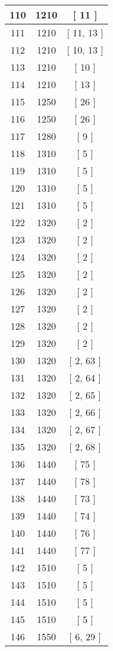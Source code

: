\begin{center}
\begin{longtable}[H]{|| c c c ||}
\hline
110 & 1210 & [ 11 ] \\ 
\hline
111 & 1210 & [ 11, 13 ] \\ 
\hline
112 & 1210 & [ 10, 13 ] \\ 
\hline
113 & 1210 & [ 10 ] \\ 
\hline
114 & 1210 & [ 13 ] \\ 
\hline
115 & 1250 & [ 26 ] \\ 
\hline
116 & 1250 & [ 26 ] \\ 
\hline
117 & 1280 & [ 9 ] \\ 
\hline
118 & 1310 & [ 5 ] \\ 
\hline
119 & 1310 & [ 5 ] \\ 
\hline
120 & 1310 & [ 5 ] \\ 
\hline
121 & 1310 & [ 5 ] \\ 
\hline
122 & 1320 & [ 2 ] \\ 
\hline
123 & 1320 & [ 2 ] \\ 
\hline
124 & 1320 & [ 2 ] \\ 
\hline
125 & 1320 & [ 2 ] \\ 
\hline
126 & 1320 & [ 2 ] \\ 
\hline
127 & 1320 & [ 2 ] \\ 
\hline
128 & 1320 & [ 2 ] \\ 
\hline
129 & 1320 & [ 2 ] \\ 
\hline
130 & 1320 & [ 2, 63 ] \\ 
\hline
131 & 1320 & [ 2, 64 ] \\ 
\hline
132 & 1320 & [ 2, 65 ] \\ 
\hline
133 & 1320 & [ 2, 66 ] \\ 
\hline
134 & 1320 & [ 2, 67 ] \\ 
\hline
135 & 1320 & [ 2, 68 ] \\ 
\hline
136 & 1440 & [ 75 ] \\ 
\hline
137 & 1440 & [ 78 ] \\ 
\hline
138 & 1440 & [ 73 ] \\ 
\hline
139 & 1440 & [ 74 ] \\ 
\hline
140 & 1440 & [ 76 ] \\ 
\hline
141 & 1440 & [ 77 ] \\ 
\hline
142 & 1510 & [ 5 ] \\ 
\hline
143 & 1510 & [ 5 ] \\ 
\hline
144 & 1510 & [ 5 ] \\ 
\hline
145 & 1510 & [ 5 ] \\ 
\hline
146 & 1550 & [ 6, 29 ] \\ 

\end{longtable}
\end{center}
